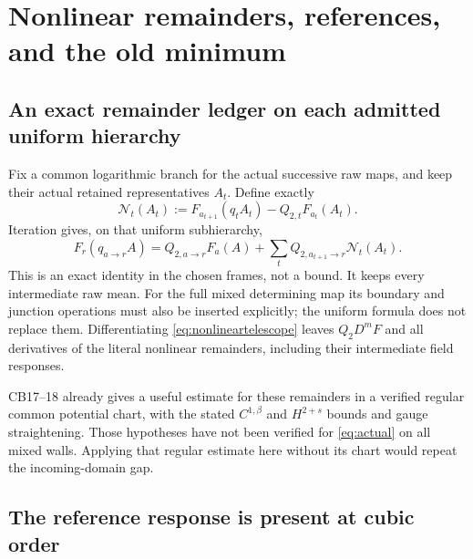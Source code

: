 \documentclass[11pt,letterpaper]{article}
\theoremstyle{plain}
\theoremstyle{remark}\newtheorem{remark}[theorem]{Scope}
\begin{document}
\section{Nonlinear remainders, references, and the old minimum}
\label{sec:nonlinear}

\subsection{An exact remainder ledger on each admitted uniform hierarchy}

Fix a common logarithmic branch for the actual successive raw maps, and
keep their actual retained representatives $A_t$. Define exactly
\begin{equation}
 \mathcal N_t(A_t)
 :=F_{a_{t+1}}(q_tA_t)-Q_{2,t}F_{a_t}(A_t).
\end{equation}
Iteration gives, on that uniform subhierarchy,
\begin{equation}
 F_r(q_{a\to r}A)
 =Q_{2,a\to r}F_a(A)
  +\sum_tQ_{2,a_{t+1}\to r}\mathcal N_t(A_t).
 \label{eq:nonlineartelescope}
\end{equation}
This is an exact identity in the chosen frames, not a bound. It keeps every
intermediate raw mean. For the full mixed determining map its boundary and
junction operations must also be inserted explicitly; the uniform formula
does not replace them. Differentiating \eqref{eq:nonlineartelescope} leaves
$Q_2D^mF$ and all derivatives of the literal nonlinear remainders, including
their intermediate field responses.

CB17--18 already gives a useful estimate for these remainders in a verified
regular common potential chart, with the stated $C^{1,\beta}$ and $H^{2+s}$
bounds and gauge straightening. Those hypotheses have not been verified
for \eqref{eq:actual} on all mixed walls. Applying that regular estimate
here without its chart would repeat the incoming-domain gap.

\subsection{The reference response is present at cubic order}
\end{document}
